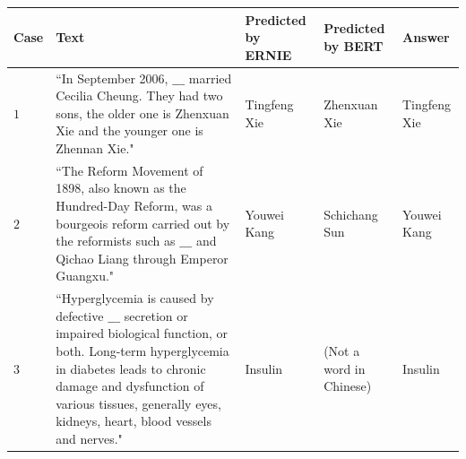 \begin{table}[htbp]
\begin{tableFont}
    \small 
    \centering
    \setlength{\tabcolsep}{6pt} %
    \renewcommand{\arraystretch}{2} %
    
    \begin{tabu} to \textwidth {| X[0.5] | X[7] | X | X | X |}
        
        \hline
  
        
        \centering \textbf{Case}
        & \centering \textbf{Text} 
        & \centering \textbf{Predicted by ERNIE}\newline 
        & \centering\textbf{Predicted by BERT} 
        & \centering \textbf{Answer} \\ 
        
        \hline
        
        
        $1$
        &
        ``In September 2006, $\_\_\_$ married Cecilia Cheung. They had two sons, the older one is Zhenxuan Xie and the younger one is Zhennan Xie." \newline
        & 
        Tingfeng Xie
        & 
        Zhenxuan Xie
        & 
        {\color{Green} Tingfeng Xie} \\ 
        
        \hline 
        
        $2$
        &
        ``The Reform Movement of 1898, also known as the Hundred-Day Reform, was a bourgeois reform carried out by the reformists such as $\_\_\_$ and Qichao Liang through Emperor Guangxu."  \newline  
        & 
        Youwei Kang
        & 
        Schichang Sun
        & 
        {\color{Green} Youwei Kang} \\ 
        
        \hline 
        
        $3$
        &
        ``Hyperglycemia is caused by defective $\_\_\_$  secretion or impaired biological function, or both. Long-term hyperglycemia in diabetes leads to chronic damage and dysfunction of various tissues, generally eyes, kidneys, heart, blood vessels and nerves."   \newline 
        & 
        Insulin
        & 
        (Not a word in Chinese)
        & 
        {\color{Green} Insulin} \\ 
        
        \hline  
        

\end{tabu}
\end{tableFont}
\end{table}

